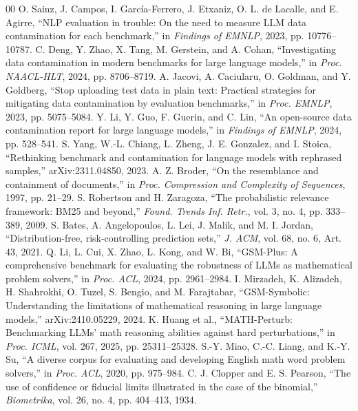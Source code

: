 \documentclass[conference]{IEEEtran}
\begin{document}
\begin{thebibliography}{00}
 O. Sainz, J. Campos, I. Garc\'ia-Ferrero, J. Etxaniz, O. L. de Lacalle, and E. Agirre, ``NLP evaluation in trouble: On the need to measure LLM data contamination for each benchmark,'' in \emph{Findings of EMNLP}, 2023, pp. 10776--10787.
 C. Deng, Y. Zhao, X. Tang, M. Gerstein, and A. Cohan, ``Investigating data contamination in modern benchmarks for large language models,'' in \emph{Proc. NAACL-HLT}, 2024, pp. 8706--8719.
 A. Jacovi, A. Caciularu, O. Goldman, and Y. Goldberg, ``Stop uploading test data in plain text: Practical strategies for mitigating data contamination by evaluation benchmarks,'' in \emph{Proc. EMNLP}, 2023, pp. 5075--5084.
 Y. Li, Y. Guo, F. Guerin, and C. Lin, ``An open-source data contamination report for large language models,'' in \emph{Findings of EMNLP}, 2024, pp. 528--541.
 S. Yang, W.-L. Chiang, L. Zheng, J. E. Gonzalez, and I. Stoica, ``Rethinking benchmark and contamination for language models with rephrased samples,'' arXiv:2311.04850, 2023.
 A. Z. Broder, ``On the resemblance and containment of documents,'' in \emph{Proc. Compression and Complexity of Sequences}, 1997, pp. 21--29.
 S. Robertson and H. Zaragoza, ``The probabilistic relevance framework: BM25 and beyond,'' \emph{Found. Trends Inf. Retr.}, vol. 3, no. 4, pp. 333--389, 2009.
 S. Bates, A. Angelopoulos, L. Lei, J. Malik, and M. I. Jordan, ``Distribution-free, risk-controlling prediction sets,'' \emph{J. ACM}, vol. 68, no. 6, Art. 43, 2021.
 Q. Li, L. Cui, X. Zhao, L. Kong, and W. Bi, ``GSM-Plus: A comprehensive benchmark for evaluating the robustness of LLMs as mathematical problem solvers,'' in \emph{Proc. ACL}, 2024, pp. 2961--2984.
 I. Mirzadeh, K. Alizadeh, H. Shahrokhi, O. Tuzel, S. Bengio, and M. Farajtabar, ``GSM-Symbolic: Understanding the limitations of mathematical reasoning in large language models,'' arXiv:2410.05229, 2024.
 K. Huang et al., ``MATH-Perturb: Benchmarking LLMs' math reasoning abilities against hard perturbations,'' in \emph{Proc. ICML}, vol. 267, 2025, pp. 25311--25328.
 S.-Y. Miao, C.-C. Liang, and K.-Y. Su, ``A diverse corpus for evaluating and developing English math word problem solvers,'' in \emph{Proc. ACL}, 2020, pp. 975--984.
 C. J. Clopper and E. S. Pearson, ``The use of confidence or fiducial limits illustrated in the case of the binomial,'' \emph{Biometrika}, vol. 26, no. 4, pp. 404--413, 1934.

\end{thebibliography}
\end{document}
